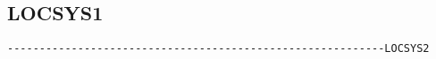 


\subsection{LOCSYS1}
\begin{verbatim}
-----------------------------------------------------------LOCSYS2
\end{verbatim}


